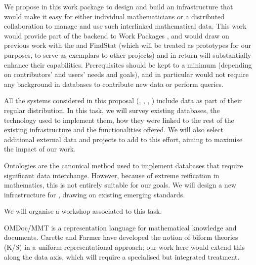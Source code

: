 \begin{workpackage}[id=dksbases,wphases=1-48!.5,
  title=Data/Knowledge/Software-Bases,lead=JU,
  ZHRM=12,JURM=36,USHRM=12,UWRM=3,SARM=9]
\begin{wpdescription}
We propose in this work package to design and build an infrastructure that would make it
easy for either individual mathematicians or a distributed collaboration to manage and use
such interlinked mathematical data. This work would provide part of the backend to Work
Packages , and would draw on previous work with
the \LMFDB and FindStat (which will be treated as prototypes for our purposes, to serve as
exemplars to other projects) and in return will substantially enhance their
capabilities. Prerequisites should be kept to a minimum (depending on contributors' and
users' needs and goals), and in particular would not require any background in databases
to contribute new data or perform queries.
\end{wpdescription}
\begin{tasklist}
\begin{task}[title=Survey of existing databases,id=data-assessment]
All the systems considered in this proposal (\GAP, \Sage, \Pari, \Singular) include data as part of their regular distribution. In this task, we will survey existing databases, the technology used to implement them, how they were linked to the rest of the existing infrastructure and the functionalities offered. We will also select additional external data and projects to add to this effort, aiming to maximise the impact of our work. 
\end{task}

\begin{task}[title={Design of new infrastructure, formulation of requirements}, id=data-design]
Ontologies are the canonical method used to implement databases that require significant data interchange. However, because of extreme reification in mathematics, this is not entirely suitable for our goals. We will design a new infrastructure for \TheProject, drawing on existing emerging standards. 

We will organise a workshop associated to this task.
\end{task}

\begin{task}[title=Triform Theories in OMDoc/MMT,id=data-triform]
OMDoc/MMT is a representation language for mathematical knowledge and documents. Carette and Farmer have developed the notion of biform theories (K/S) in a uniform representational approach; our work here would extend this along the data axis, which will require a specialised but integrated treatment.
\end{task}


\end{tasklist}
\end{workpackage}
